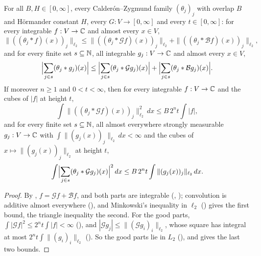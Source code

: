 \begin{lemma}
\label{lem:good-part-split}
\leanok
{}
For all $B, H \in [0, \infty]$, every Calder\'on--Zygmund family $(\theta_j)_j$ with overlap
$B$ and H\"ormander constant $H$, every $G : V \to [0, \infty]$ and every $t \in [0, \infty]$:
for every integrable $f : V \to \mathbb{C}$ and almost every $x \in V$,
\[
  \|((\theta_j * f)(x))_j\|_{\ell_2} \leq \|((\theta_j * \mathcal G f)(x))_j\|_{\ell_2}
  + \|((\theta_j * \mathcal B f)(x))_j\|_{\ell_2} ,
\]
and for every finite set $s \subseteq \mathbb{N}$, all integrable $g_j : V \to \mathbb{C}$ and almost every
$x \in V$,
\[
  \Bigl|\sum_{j \in s} (\theta_j * g_j)(x)\Bigr|
  \leq \Bigl|\sum_{j \in s} (\theta_j * \mathcal G g_j)(x)\Bigr|
  + \Bigl|\sum_{j \in s} (\theta_j * \mathcal B g_j)(x)\Bigr| .
\]
If moreover $n \geq 1$ and $0 < t < \infty$, then for every integrable $f : V \to \mathbb{C}$ and the
cubes of $|f|$ at height $t$,
\[
  \int \|((\theta_j * \mathcal G f)(x))_j\|_{\ell_2}^2 \, dx \leq B \, 2^n t \int |f| ,
\]
and for every finite set $s \subseteq \mathbb{N}$, all almost everywhere strongly measurable
$g_j : V \to \mathbb{C}$ with $\int \|(g_j(x))_j\|_{\ell_2} \, dx < \infty$ and the cubes of
$x \mapsto \|(g_j(x))_j\|_{\ell_2}$ at height $t$,
\[
  \int \Bigl|\sum_{j \in s} (\theta_j * \mathcal G g_j)(x)\Bigr|^2 \, dx
  \leq B \, 2^n t \int \|(g_j(x))_j\|_{\ell_2} \, dx .
\]
\end{lemma}

\begin{proof}
\leanok
By , $f = \mathcal G f + \mathcal B f$, and both parts
are integrable
(, ); convolution
is additive almost everywhere (), and Minkowski's inequality in $\ell_2$
() gives the first bound, the triangle inequality the second. For the good
parts, $\int |\mathcal G f|^2 \leq 2^n t \int |f| < \infty$
(), and
$|\mathcal G g_j| \leq \|(\mathcal G g_i)_i\|_{\ell_2}$, whose square has integral at most
$2^n t \int \|(g_i)_i\|_{\ell_2}$ (). So the good parts
lie in $L_2$ (), and  gives the
last two bounds.
\end{proof}

